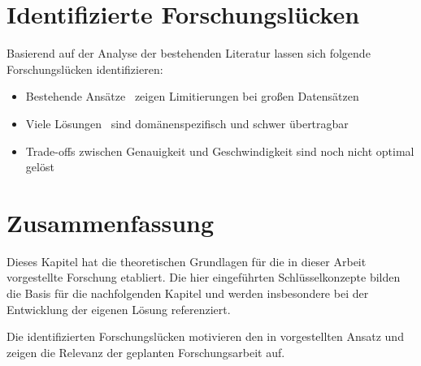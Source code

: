 \section{Identifizierte Forschungslücken}
\label{sec:research_gaps}

Basierend auf der Analyse der bestehenden Literatur lassen sich folgende Forschungslücken identifizieren:

\begin{itemize}
	\item {} Bestehende Ansätze~\cite{example_report} zeigen Limitierungen bei großen Datensätzen
	\item {} Viele Lösungen~\cite{example_thesis} sind domänenspezifisch und schwer übertragbar
	\item {} Trade-offs zwischen Genauigkeit und Geschwindigkeit sind noch nicht optimal gelöst~\cite{example_article}
\end{itemize}

\section{Zusammenfassung}
\label{sec:fundamentals_summary}

Dieses Kapitel hat die theoretischen Grundlagen für die in dieser Arbeit vorgestellte Forschung etabliert.
Die hier eingeführten Schlüsselkonzepte bilden die Basis für die nachfolgenden Kapitel und werden insbesondere bei der Entwicklung der eigenen Lösung referenziert.

Die identifizierten Forschungslücken motivieren den in  vorgestellten Ansatz und zeigen die Relevanz der geplanten Forschungsarbeit auf.
